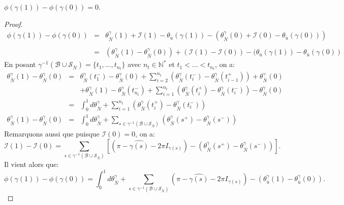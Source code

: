 \begin{lemma}
    \label{lem:marvelous_lemma}
    $\phi(\gamma(1))-\phi(\gamma(0))=0$.
\end{lemma}
\begin{proof}
    $$
    \begin{array}{lcl}
        \phi(\gamma(1))-\phi(\gamma(0))&=&\theta^\gamma_{\bar{N}}(1)+\mathcal{I}(1)-\theta_{\bar{u}}(\gamma(1))-(\theta^\gamma_{\bar{N}}(0)+\mathcal{I}(0)-\theta_{\bar{u}}(\gamma(0)))\\\\
        &=&(\theta^\gamma_{\bar{N}}(1)-\theta_{\bar{N}}^\gamma(0))+(\mathcal{I}(1)-\mathcal{I}(0))-(\theta_{\bar{u}}(\gamma(1))-\theta_{\bar{u}}(\gamma(0))
    \end{array}
    $$
    En posant $\gamma^{-1}(\mathcal{B}\cup\mathcal{S}_{\bar{N}})=\{t_1,\dots,t_{n_t}\}$ avec $n_t\in\mathbb{N}^*$ et $t_1<\dots<t_{n_t}$, on a:
    $$
    \begin{array}{lcl}
        \theta_{\bar{N}}^\gamma(1)-\theta^\gamma_{\bar{N}}(0)&=&\theta_{\bar{N}}^\gamma(t_1^-)-\theta_{\bar{N}}^\gamma(0)+\displaystyle\sum_{i=2}^{n_t}\left(\theta_{\bar{N}}^\gamma(t_i^-)-\theta_{\bar{N}}^\gamma(t_{i-1}^+)\right)+\theta_{\bar{N}}^\gamma(0)\\[0.7cm]
        &&+\theta_{\bar{N}}^\gamma(1)-\theta_{\bar{N}}^\gamma(t_{n_t}^-)+\displaystyle\sum_{i=1}^{n_t}\left(\theta_{\bar{N}}^\gamma(t_i^+)-\theta_{\bar{N}}^\gamma(t_i^-)\right)-\theta_{\bar{N}}^\gamma(0)\\[0.7cm]
        &=&\displaystyle\int_0^1d\theta_{\bar{N}}^\gamma+\displaystyle\sum_{i=1}^{n_t}\left(\theta_{\bar{N}}^\gamma(t_i^+)-\theta_{\bar{N}}^\gamma(t_i^-)\right)\\[0.7cm]
        \theta_{\bar{N}}^\gamma(1)-\theta^\gamma_{\bar{N}}(0)&=&\displaystyle\int_0^1d\theta_{\bar{N}}^\gamma+\displaystyle\sum_{s\in\gamma^{-1}(\mathcal{B}\cup\mathcal{S}_{\bar{N}})}\left(\theta_{\bar{N}}^\gamma(s^+)-\theta_{\bar{N}}^\gamma(s^-)\right)
    \end{array}
    $$
    Remarquons aussi que puisque $\mathcal{I}(0)=0$, on a:
    $$
    \mathcal{I}(1)-\mathcal{I}(0)=\sum_{s\in\gamma^{-1}(\mathcal{B}\cup\mathcal{S}_{\bar{N}})}\left[\left(\pi-\widehat{\gamma(s)}-2\pi I_{\gamma(s)}\right)-\left(\theta^{\gamma}_{\bar{N}}(s^+)-\theta^{\gamma}_{\bar{N}}(s^-)\right)\right].
    $$
    Il vient alors que:
    $$
    \phi(\gamma(1))-\phi(\gamma(0))=\displaystyle\int_0^1d\theta_{\bar{N}}^\gamma+\sum_{s\in\gamma^{-1}(\mathcal{B}\cup\mathcal{S}_{\bar{N}})}\left(\pi-\widehat{\gamma(s)}-2\pi I_{\gamma(s)}\right)-(\theta_{\bar{u}}^\gamma(1)-\theta_{\bar{u}}^\gamma(0)).
$$
\end{proof}
